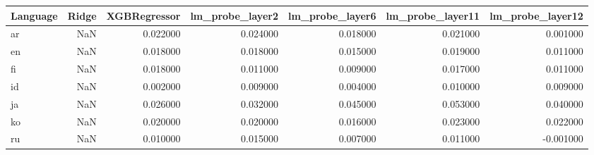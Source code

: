 \begin{tabular}{lrrrrrr}
\toprule
Language & Ridge & XGBRegressor & lm_probe_layer2 & lm_probe_layer6 & lm_probe_layer11 & lm_probe_layer12 \\
\midrule
ar & NaN & 0.022000 & 0.024000 & 0.018000 & 0.021000 & 0.001000 \\
en & NaN & 0.018000 & 0.018000 & 0.015000 & 0.019000 & 0.011000 \\
fi & NaN & 0.018000 & 0.011000 & 0.009000 & 0.017000 & 0.011000 \\
id & NaN & 0.002000 & 0.009000 & 0.004000 & 0.010000 & 0.009000 \\
ja & NaN & 0.026000 & 0.032000 & 0.045000 & 0.053000 & 0.040000 \\
ko & NaN & 0.020000 & 0.020000 & 0.016000 & 0.023000 & 0.022000 \\
ru & NaN & 0.010000 & 0.015000 & 0.007000 & 0.011000 & -0.001000 \\
\bottomrule
\end{tabular}
